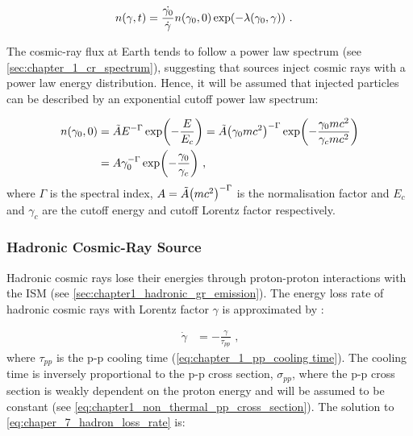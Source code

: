 \begin{equation}
    \begin{aligned}
    n\qty(\gamma,t)&=\frac{\dot{\gamma_0}}{\dot{\gamma}}n\qty(\gamma_0,0)\exp(-\lambda\qty(\gamma_0,\gamma))\text{ .}
    \end{aligned} \label{eq:chapter_7_cr_energy_distribution_imp} 
\end{equation}

The cosmic-ray flux at Earth tends to follow a power law spectrum (see \autoref{sec:chapter_1_cr_spectrum}), suggesting that sources inject cosmic rays with a power law energy distribution. Hence, it will be assumed that injected particles can be described by an exponential cutoff power law spectrum:

\begin{equation}
    \begin{aligned}
    n\qty(\gamma_0,0)&=\tilde{A}E^{-\Gamma}\exp(-\frac{E}{E_c})=\tilde{A}\qty(\gamma_0 mc^2)^{-\Gamma}\exp(-\frac{\gamma_0 mc^2}{\gamma_c mc^2}) \\
	&=A\gamma_0^{-\Gamma}\exp(-\frac{\gamma_0}{\gamma_c})\text{ ,}
    \end{aligned} \label{eq:chapter_7_cr_energy_distribution_imp_t0} 
\end{equation}
\noindent where $\Gamma$ is the spectral index, $A=\tilde{A}\qty(mc^2)^{-\Gamma}$ is the normalisation factor and $E_c$ and $\gamma_c$ are the cutoff energy and cutoff Lorentz factor respectively.

\subsubsection{Hadronic Cosmic-Ray Source}

Hadronic cosmic rays lose their energies through proton-proton interactions with the ISM (see \autoref{sec:chapter1_hadronic_gr_emission}). The energy loss rate of hadronic cosmic rays with Lorentz factor $\gamma$ is approximated by \cite{1996A&A...309..917A}:

\begin{equation}
    \begin{aligned}
    \dot{\gamma}&=-\frac{\gamma}{\tau_{pp}} \text{ ,}
    \end{aligned} \label{eq:chaper_7_hadron_loss_rate}
\end{equation}
\noindent where $\tau_{pp}$ is the p-p cooling time (\autoref{eq:chapter_1_pp_cooling time}). The cooling time is inversely proportional to the p-p cross section, $\sigma_{pp}$, where the p-p cross section is weakly dependent on the proton energy and will be assumed to be constant (see \autoref{eq:chapter1_non_thermal_pp_cross_section}). The solution to \autoref{eq:chaper_7_hadron_loss_rate} is:


